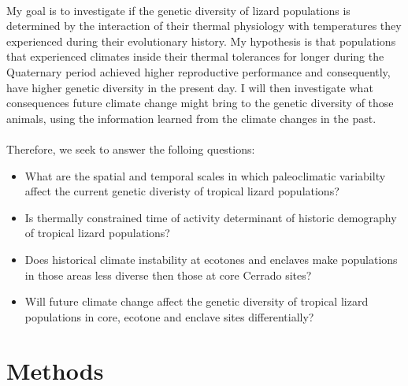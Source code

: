 \documentclass{article}
\begin{document}
{\paragraph{} My goal is to investigate if the genetic diversity of lizard populations is determined by the interaction of their thermal physiology with temperatures they experienced during their evolutionary history. My hypothesis is that populations that experienced climates inside their thermal tolerances for longer during the Quaternary period achieved higher reproductive performance and consequently, have higher genetic diversity in the present day. I will then investigate what consequences future climate change might bring to the genetic diversity of those animals, using the information learned from the climate changes in the past.

\paragraph{} Therefore, we seek to answer the folloing questions: 

\begin{itemize}
	
\item What are the spatial and temporal scales in which paleoclimatic variabilty affect the current genetic diveristy of tropical lizard populations?

\item Is thermally constrained time of activity determinant of historic demography of tropical lizard populations?

\item Does historical climate instability at ecotones and enclaves make populations in those areas less diverse then those at core Cerrado sites?

\item Will future climate change affect the genetic diversity of tropical lizard populations in core, ecotone and enclave sites differentially?

\end{itemize}

\section{Methods}

}
\end{document}
